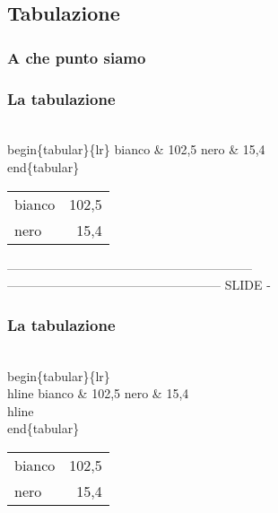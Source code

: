 \subsection{Tabulazione}
\begin{frame}
  \frametitle{A che punto siamo}
\end{frame}
\begin{frame}
  \frametitle{La tabulazione}
	\begin{LaTeXcode}
		\\begin\{tabular\}\{\alert{lr}\}\n
		\hspace*{5ex}bianco \alert{\&} 102,5 \alert{\bs\bs}\n
		\hspace*{5ex}nero   \alert{\&} 15,4 \alert{\bs\bs}\n
		\\end\{tabular\}
	\end{LaTeXcode}
	\begin{LaTeXoutput}
		\begin{tabular}{l r}
		bianco & 102,5 \\
		nero   & 15,4 \\
		\end{tabular}
	\end{LaTeXoutput}
\end{frame}
-----------------------------------------------------------
--------------------------------------------------- SLIDE -
\begin{frame}
  \frametitle{La tabulazione}
	\begin{LaTeXcode}
		\\begin\{tabular\}\{lr\}\
		\alert{\\hline}\n
		\hspace*{5ex}bianco \& 102,5 \bs\bs\n
		\hspace*{5ex}nero   \& 15,4 \bs\bs\
		\alert{\\hline}\n
		\\end\{tabular\}
	\end{LaTeXcode}
	\begin{LaTeXoutput}
		\begin{tabular}{l r}
		\hline
		bianco & 102,5 \\
		nero   & 15,4 \\
		\hline
		\end{tabular}
	\end{LaTeXoutput}
\end{frame}
